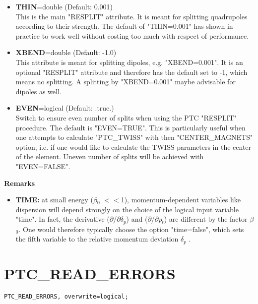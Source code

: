 \begin{itemize}
   \item {\bf THIN}=double (Default: 0.001) \\ 
     This is the main "RESPLIT" attribute. It is meant for splitting
     quadrupoles according to their strength. The default of
     "THIN=0.001" has shown in practice to work well without costing too
     much with respect of performance.   

   \item {\bf XBEND}=double (Default: -1.0) \\ 
     This attribute is meant for splitting dipoles,
     e.g. "XBEND=0.001". It is an optional "RESPLIT" attribute and
     therefore has the default set to -1, which means no splitting. A
     splitting by "XBEND=0.001" maybe advisable for dipoles as well. 

   \item {\bf EVEN}=logical (Default: .true.) \\
     Switch to ensure even number of splits when using the PTC "RESPLIT"
     procedure. The default is "EVEN=TRUE". This is particularly useful
     when one attempts to calculate "PTC\_TWISS" with then
     "CENTER\_MAGNETS" option, i.e. if one would like to calculate the
     TWISS parameters in the center of the element. Uneven number of
     splits will be achieved with "EVEN=FALSE".  

\end{itemize}
  

{\bf Remarks} \\ 
\begin{itemize}  
  \item {\bf TIME:} at small energy ($\beta$$_0$  $<$$<$1),
  momentum-dependent variables like dispersion will depend  strongly on
  the choice of  the logical input variable "time".  In fact, the
  derivative ($\partial$/$\partial$\textit{$\delta$}$_\textit{p}$)  and
  ($\partial$/$\partial$\textit{p}$_\textit{t}$)  are different by the
  factor \textit{$\beta$}$_0$. One would  therefore typically  choose
  the option "time=false",  which sets the fifth variable to
  the relative momentum deviation \textit{$ \delta_p$ }.\\   

\end{itemize}

\section{PTC\_READ\_ERRORS}

\begin{verbatim}
PTC_READ_ERRORS, overwrite=logical; 
\end{verbatim}

